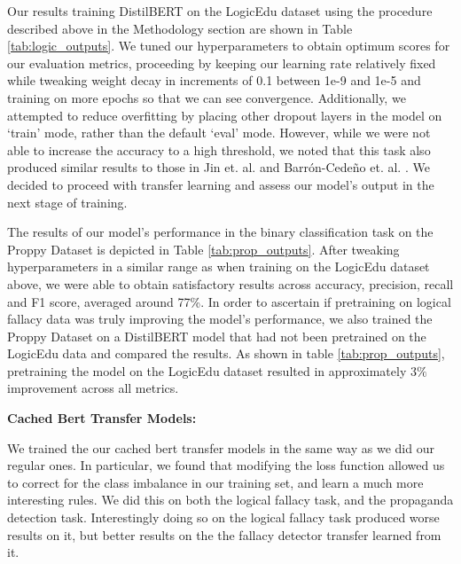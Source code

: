 \documentclass[conference]{IEEEtran}
\begin{document}


Our results training DistilBERT on the LogicEdu dataset using the procedure described above in the Methodology section are shown in Table \ref{tab:logic_outputs}. We tuned our hyperparameters to obtain optimum scores for our evaluation metrics, proceeding by keeping our learning rate relatively fixed while tweaking weight decay in increments of 0.1 between 1e-9 and 1e-5 and training on more epochs so that we can see convergence. Additionally, we attempted to reduce overfitting by placing other dropout layers in the model on `train' mode, rather than the default `eval' mode. However, while we were not able to increase the accuracy to a high threshold, we noted that this task also produced similar results to those in Jin et. al. and Barrón-Cedeño et. al. \cite{Proppy,jin2022logical}. We decided to proceed with transfer learning and assess our model's output in the next stage of training.

The results of our model's performance in the binary classification task on the Proppy Dataset is depicted in Table \ref{tab:prop_outputs}. After tweaking hyperparameters in a similar range as when training on the LogicEdu dataset above, we were able to obtain satisfactory results across accuracy, precision, recall and F1 score, averaged around 77\%. In order to ascertain if pretraining on logical fallacy data was truly improving the model's performance, we also trained the Proppy Dataset on a DistilBERT model that had not been pretrained on the LogicEdu data and compared the results. As shown in table \ref{tab:prop_outputs}, pretraining the model on the LogicEdu dataset resulted in approximately $3\%$ improvement across all metrics. 



\textbf{Cached Bert Transfer Models:} 

We trained the our cached bert transfer models in the same way as we did our regular ones. In particular, we found that modifying the loss function allowed us to correct for the class imbalance in our training set, and learn a much more interesting rules. We did this on both the logical fallacy task, and the propaganda detection task. Interestingly doing so on the logical fallacy task produced worse results on it, but better results on the the fallacy detector transfer learned from it. 
\end{document}
